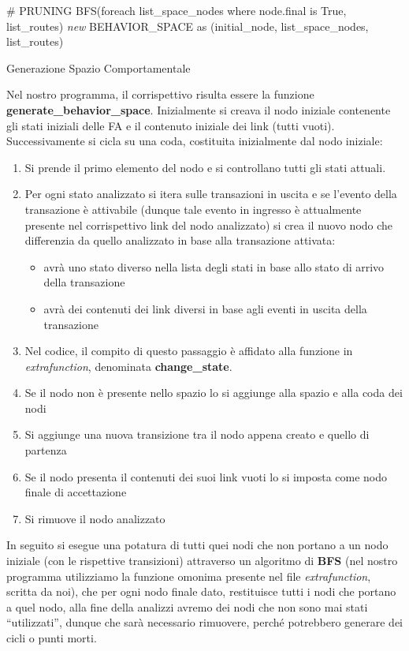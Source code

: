 \begin{algorithm}[H]
\resumenumbering
\SetAlgoLined
{}
 \# PRUNING\;
 BFS(foreach list\_space\_nodes where node.final is True, list\_routes)\;
 \textit{new} BEHAVIOR\_SPACE as (initial\_node, list\_space\_nodes, list\_routes)
 \caption{Generazione Spazio Comportamentale}
\end{algorithm}
Nel nostro programma, il corrispettivo risulta essere la funzione \textbf{generate\_behavior\_space}.
Inizialmente si creava il nodo iniziale contenente gli stati iniziali delle FA e il contenuto iniziale dei link (tutti vuoti).
Successivamente si cicla su una coda, costituita inizialmente dal nodo iniziale:
\begin{enumerate}
    \item Si prende il primo elemento del nodo e si controllano tutti gli stati attuali.
    \item Per ogni stato analizzato si itera sulle transazioni in uscita e se l’evento della transazione è attivabile (dunque tale evento in ingresso è attualmente presente nel corrispettivo link del nodo analizzato) si crea il nuovo nodo che differenzia da quello analizzato in base alla transazione attivata: \begin{itemize}
        \item avrà uno stato diverso nella lista degli stati in base allo stato di arrivo della transazione
        \item avrà dei contenuti dei link diversi in base agli eventi in uscita della transazione
    \end{itemize}
    \item Nel codice, il compito di questo passaggio è affidato alla funzione in \textit{extrafunction}, denominata \textbf{change\_state}.
    \item Se il nodo non è presente nello spazio lo si aggiunge alla spazio e alla coda dei nodi
    \item Si aggiunge una nuova transizione  tra il nodo appena creato e quello di partenza
    \item Se il nodo presenta il contenuti dei suoi link vuoti lo si imposta come nodo finale di accettazione
    \item Si rimuove il nodo analizzato
\end{enumerate}
In seguito si esegue una potatura di tutti quei nodi che non portano a un nodo iniziale (con le rispettive transizioni) attraverso un algoritmo di \textbf{BFS} (nel nostro programma utilizziamo la funzione omonima presente nel file \textit{extrafunction}, scritta da noi), che per ogni nodo finale dato, restituisce tutti i nodi che portano a quel nodo, alla fine della analizzi avremo dei nodi che non sono mai stati “utilizzati”, dunque che sarà necessario rimuovere, perché potrebbero generare dei cicli o punti morti.

